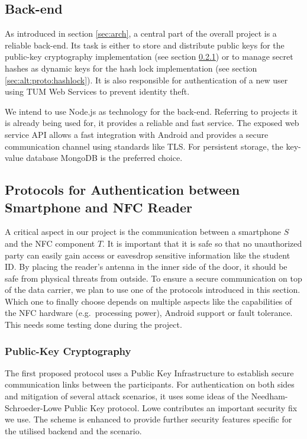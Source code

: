 \subsection{Back-end}\label{sec:alt:backend}
As introduced in section \ref{sec:arch}, a central part of the overall project is a reliable back-end.
Its task is either to store and distribute public keys for the public-key cryptography implementation (see section \ref{sec:alt:proto:pubkey}) or to manage secret hashes as dynamic keys for the hash lock implementation (see section \ref{sec:alt:proto:hashlock}).
It is also responsible for authentication of a new user using TUM Web Services to prevent identity theft.

We intend to use Node.js as technology for the back-end. Referring to projects it is already being used for, it provides a reliable and fast service.
The exposed web service API allows a fast integration with Android and provides a secure communication channel using standards like TLS.
For persistent storage, the key-value database MongoDB is the preferred choice.


\subsection{Protocols for Authentication between Smartphone and NFC Reader}\label{sec:alt:proto}
A critical aspect in our project is the communication between a smartphone $ S $ and the NFC component $ T $.
It is important that it is safe so that no unauthorized party can easily gain access or eavesdrop sensitive information like the student ID.
By placing the reader's antenna in the inner side of the door, it should be safe from physical threats from outside.
To ensure a secure communication on top of the data carrier, we plan to use one of the protocols introduced in this section.
Which one to finally choose depends on multiple aspects like the capabilities of the NFC hardware (e.g.~processing power), Android support or fault tolerance. This needs some testing done during the project. 

\subsubsection{Public-Key Cryptography}\label{sec:alt:proto:pubkey}
The first proposed protocol uses a Public Key Infrastructure to establish secure communication links between the participants.
For authentication on both sides and mitigation of several attack scenarios, it uses some ideas of the Needham-Schroeder-Lowe Public Key protocol. Lowe contributes an important security fix we use.
The scheme is enhanced to provide further security features specific for the utilised backend and the scenario.

